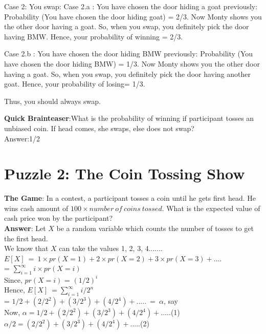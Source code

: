 \documentclass[a4paper]{article}
\begin{document}
Case 2: You swap: 
Case 2.a : You have chosen the door hiding a goat previously: 
Probability (You have chosen the door hiding goat) = 2/3. Now Monty shows you the other door having a goat. So, when you swap, you definitely pick the door having BMW. Hence, your probability of winning = 2/3.

Case 2.b : You have chosen the door hiding BMW previously: 
Probability (You have chosen the door hiding BMW) = 1/3. Now Monty shows you the other door having a goat. So, when you swap, you definitely pick the door having another goat. Hence, your probability of losing= 1/3.

Thus, you should always swap.

\textbf{Quick Brainteaser}:What is the probability of winning if participant tosses an unbiased coin. If head comes, she swaps, else does not swap? \\
Answer:1/2 \\


\section{Puzzle 2: The Coin Tossing Show}
\textbf{The Game}: In a contest, a participant tosses a coin until he gets first head. He wins cash amount of $100 \times number\ of\ coins\ tossed$. What is the expected value of cash price won by the participant?\\

\textbf{Answer}: 
Let $X$ be a random variable which counts the number of tosses to get the first head.\\

We know that $X$ can take the values 1, 2, 3, 4.......\\
$E[X]\ =\ 1 \times pr(X=1) + 2 \times pr(X=2) + 3 \times pr(X=3)+ .... $\\

= $\sum_{i=1}^{\infty} i \times pr(X=i) $\\

Since, $ pr(X=i) $ = $(1/2)^i$\\

Hence, $E[X]\ = \sum_{i=1}^{\infty} i/2^{n} $\\

= $1/2+(2/2^2)+(3/2^3)+(4/2^4)+.....\ =\ \alpha$, say\\

Now, $\alpha = 1/2+(2/2^2)+(3/2^3)+(4/2^4)+.....$(1)\\

$\alpha/2 = (2/2^2)+(3/2^3)+(4/2^4)+.....$(2)\\
\end{document}
